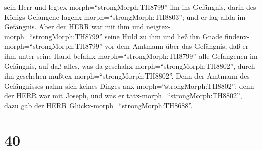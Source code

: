 sein Herr und legtex-morph=``strongMorph:TH8799'' ihn ins Gefängnis,
darin des Königs Gefangene lagenx-morph=``strongMorph:TH8803''; und er
lag allda im Gefängnis.  Aber der HERR war mit ihm und
neigtex-morph=``strongMorph:TH8799'' seine Huld zu ihm und ließ ihn
Gnade findenx-morph=``strongMorph:TH8799'' vor dem Amtmann über das
Gefängnis,  daß er ihm unter seine Hand
befahlx-morph=``strongMorph:TH8799'' alle Gefangenen im Gefängnis, auf
daß alles, was da geschahx-morph=``strongMorph:TH8802'', durch ihn
geschehen mußtex-morph=``strongMorph:TH8802''.  Denn der
Amtmann des Gefängnisses nahm sich keines Dinges
anx-morph=``strongMorph:TH8802''; denn der HERR war mit Joseph, und was
er tatx-morph=``strongMorph:TH8802'', dazu gab der HERR
Glückx-morph=``strongMorph:TH8688''.

\hypertarget{section-39}{%
\section{40}\label{section-39}}

